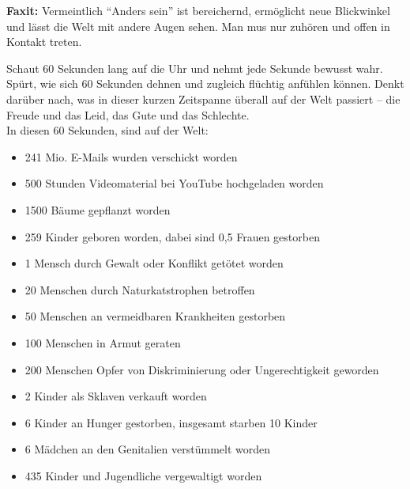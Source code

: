 \textbf{Faxit:}
Vermeintlich “Anders sein” ist bereichernd, ermöglicht neue Blickwinkel und lässt die Welt mit andere Augen sehen. Man mus nur zuhören und offen in Kontakt treten.


Schaut 60 Sekunden lang auf die Uhr und nehmt jede Sekunde bewusst wahr. Spürt, wie sich 60 Sekunden dehnen und zugleich flüchtig anfühlen können. Denkt darüber nach, was in dieser kurzen Zeitspanne überall auf der Welt passiert – die Freude und das Leid, das Gute und das Schlechte. \\
\newline
In diesen 60 Sekunden, sind auf der Welt:
\begin{itemize}
	\item 241 Mio. E-Mails wurden verschickt worden
	\item 500 Stunden Videomaterial bei YouTube hochgeladen worden
	\item 1500 Bäume gepflanzt worden
	\item 259 Kinder geboren worden, dabei sind 0,5 Frauen gestorben
	\item 1 Mensch durch Gewalt oder Konflikt getötet worden
	\item 20 Menschen durch Naturkatstrophen betroffen
	\item 50 Menschen an vermeidbaren Krankheiten gestorben
	\item 100 Menschen in Armut geraten
	\item 200 Menschen Opfer von Diskriminierung oder Ungerechtigkeit geworden
	\item 2 Kinder als Sklaven verkauft worden
	\item 6 Kinder an Hunger gestorben, insgesamt starben 10 Kinder
	\item 6 Mädchen an den Genitalien verstümmelt worden
	\item 435 Kinder und Jugendliche vergewaltigt worden
\end{itemize}


